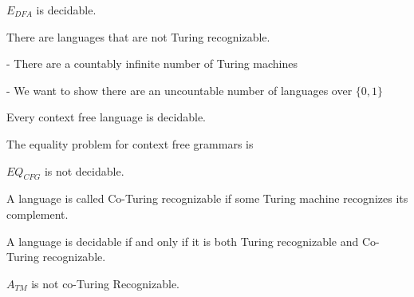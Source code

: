     \begin{theorem}
        $E_{DFA}$ is decidable.
    \end{theorem}



\begin{theorem}
    There are languages that are not Turing recognizable.
\end{theorem}

    -   There are a countably infinite number of Turing machines

    -   We want to show there are an uncountable number of languages over $\{0,1\}$



\begin{theorem}
    Every context free language is decidable.
\end{theorem}


    \begin{definition}
        The equality problem for context free grammars is 
    \end{definition}

    \begin{theorem}
        $EQ_{CFG}$ is not decidable.
    \end{theorem}



\begin{definition}
    A language is called Co-Turing recognizable if some Turing machine recognizes its complement.
\end{definition}

\begin{theorem}
    A language is decidable if and only if it is both Turing recognizable and Co-Turing recognizable.
\end{theorem}

\begin{corollary}
    $A_{TM}$ is not co-Turing Recognizable.
\end{corollary}
